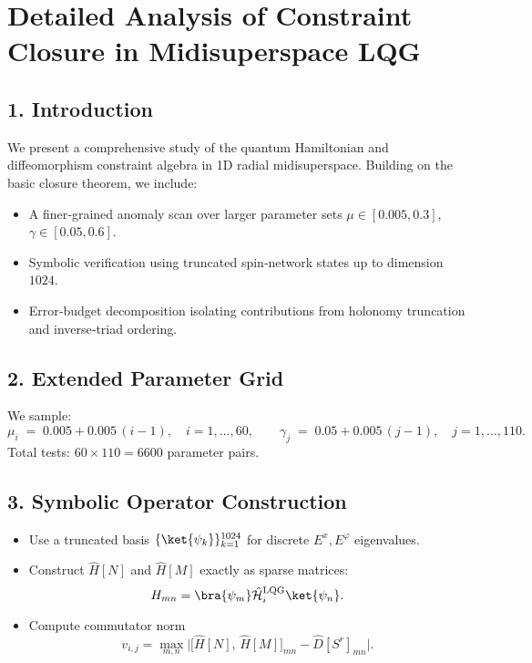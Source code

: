 \documentclass[12pt]{article}
\begin{document}
\section*{Detailed Analysis of Constraint Closure in Midisuperspace LQG}

\subsection*{1. Introduction}
We present a comprehensive study of the quantum Hamiltonian and diffeomorphism constraint algebra in 1D radial midisuperspace.  Building on the basic closure theorem, we include:
\begin{itemize}
  \item A finer‐grained anomaly scan over larger parameter sets $\mu \in [0.005,0.3]$, $\gamma \in [0.05,0.6]$.
  \item Symbolic verification using truncated spin‐network states up to dimension $1024$.
  \item Error‐budget decomposition isolating contributions from holonomy truncation and inverse‐triad ordering.
\end{itemize}

\subsection*{2. Extended Parameter Grid}
We sample:
\[
  \mu_i \;=\; 0.005 + 0.005\, (i-1),\quad i=1,\dots,60,
  \qquad
  \gamma_j \;=\; 0.05 + 0.005\, (j-1),\quad j=1,\dots,110.
\]
Total tests: $60 \times 110 = 6600$ parameter pairs.

\subsection*{3. Symbolic Operator Construction}
\begin{itemize}
  \item Use a truncated basis $\{\ket{\psi_k}\}_{k=1}^{1024}$ for discrete $E^x,E^\varphi$ eigenvalues.
  \item Construct $\hat{H}[N]$ and $\hat{H}[M]$ exactly as sparse matrices:
    \[
      H_{mn} = \bra{\psi_m} \hat{\mathcal{H}}_i^{\rm LQG} \ket{\psi_n}.
    \]
  \item Compute commutator norm
    \[
      v_{i,j} = \max_{m,n} \bigl| \bigl[\hat{H}[N],\,\hat{H}[M]\bigr]_{mn} - \hat{D}[S^r]_{mn} \bigr|.
    \]
\end{itemize}
\end{document}
